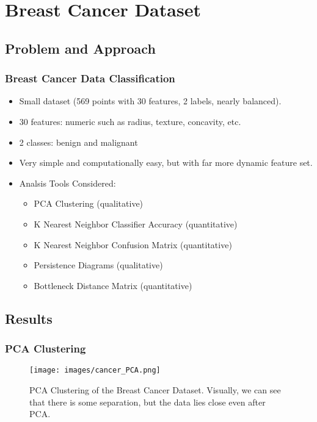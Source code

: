 \section{Breast Cancer Dataset}
	\subsection{Problem and Approach}
		\begin{frame}
		\frametitle{Breast Cancer Data Classification}
		
		\begin{itemize}
			\item Small dataset (569 points with 30 features, 2 labels, nearly balanced).
			\item 30 features: numeric such as radius, texture, concavity, etc. 
			\item 2 classes: benign and malignant
			\item Very simple and computationally easy, but with far more dynamic feature set.
			\item Analsis Tools Considered:
				\begin{itemize}
					\item PCA Clustering (qualitative)
					\item K Nearest Neighbor Classifier Accuracy (quantitative)
					\item K Nearest Neighbor Confusion Matrix (quantitative)
					\item Persistence Diagrams (qualitative)
					\item Bottleneck Distance Matrix (quantitative)
				\end{itemize}
		\end{itemize}
		
		\end{frame}
		
	\subsection{Results}
		
		\begin{frame}
		\frametitle{PCA Clustering}
		
		\begin{figure}
				\centering
				\texttt{[image: images/cancer\_PCA.png]}
				\caption{PCA Clustering of the Breast Cancer Dataset. Visually, we can see that there is some separation, but the data lies close even after PCA.}
		\end{figure}
		
		\end{frame}
		
